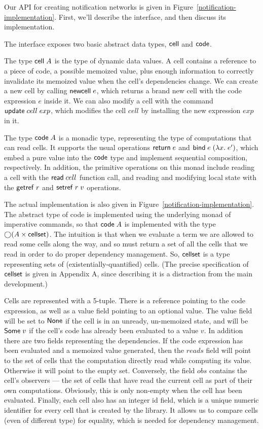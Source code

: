 \documentclass[preprint,natbib]{sigplanconf}
\begin{document}
Our API for creating notification networks is given in
Figure~\ref{notification-implementation}. First, we'll describe
the interface, and then discuss its implementation. 

The interface exposes two basic abstract data types, $\mbox{\textsf{{cell}}}$
and $\mbox{\textsf{{code}}}$.

The type $\mbox{\textsf{{cell}}}\;{A}$ is the type of dynamic data values. A cell
contains a reference to a piece of code, a possible memoized value,
plus enough information to correctly invalidate its memoized value
when the cell's dependencies change. We can create a new cell by
calling $\mbox{\textsf{{newcell}}}\; e$, which returns a brand new cell with the
code expression $e$ inside it. We can also modify a cell with 
the command $\mbox{\textsf{{update}}}\;cell\;exp$, which modifies the cell
$cell$ by installing the new expression $exp$ in it. 

The type $\mbox{\textsf{{code}}}\;{A}$ is a monadic type, representing the type of
computations that can read cells. It supports the usual operations
$\mbox{\textsf{{return}}}\; e$ and $\mbox{\textsf{{bind}}}\; e\; (\lambda x.\;e')$, which embed a pure value
into the $\mbox{\textsf{{code}}}$ type and implement sequential composition,
respectively. In addition, the primitive operations on this monad 
include reading a cell with the $\mbox{\textsf{{read}}}\; cell$ function call, and 
reading and modifying local state with the $\mbox{\textsf{{getref}}}\; r$ and $\mbox{\textsf{{setref}}}\; r\;v$
operations. 
 
The actual implementation is also given in
Figure~\ref{notification-implementation}. The abstract type of code is
implemented using the underlying monad of imperative commands, so that
$\mbox{\textsf{{code}}}\;{A}$ is implemented with the type $\bigcirc{(A \times
  \mbox{\textsf{{cellset}}})}$.  The intuition is that when we evaluate a term we are
allowed to read some cells along the way, and so must return a set of
all the cells that we read in order to do proper dependency
management. So, $\mbox{\textsf{{cellset}}}$ is a type representing sets of
(existentially-quantified) cells.  (The precise specification of
$\mbox{\textsf{{cellset}}}$ is given in Appendix A, since describing it is a
distraction from the main development.)

Cells are represented with a 5-tuple. There is a reference pointing to
the code expression, as well as a value field pointing to an optional
value. The value field will be set to $\mbox{\textsf{{None}}}$ if the cell is in
an unready, un-memoized state, and will be $\mbox{\textsf{{Some}}}\;v$ if the
cell's code has already been evaluated to a value $v$. In addition there are
two fields representing the dependencies. If the code expression has
been evaluated and a memoized value generated, then the $reads$ field
will point to the set of cells that the computation directly read
while computing its value. Otherwise it will point to the empty
set. Conversely, the field $obs$ contains the cell's observers --- the
set of cells that have read the current cell as part of their own
computations. Obviously, this is only non-empty when the cell has been
evaluated. Finally, each cell also has an integer id field, which is a
unique numeric identifier for every cell that is created by the
library. It allows us to compare cells (even of different type) for
equality, which is needed for dependency management.
\end{document}
